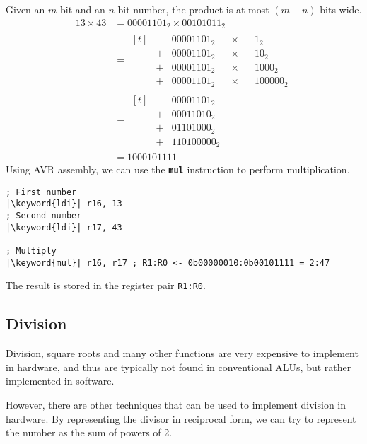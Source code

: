\documentclass{report}
\newcommand{\keyword}[1]{\textcolor[rgb]{0.00,0.50,0.00}{\textbf{#1}}}
\newcommand{\keywordinline}[1]{\textcolor[rgb]{0.00,0.50,0.00}{\textbf{\texttt{#1}}}}
\begin{document}
Given an \(m\)-bit and an \(n\)-bit number, the product is at most
\((m+n)\)-bits wide.
\begin{align*}
    13 \times 43 & = 00001101_2 \times 00101011_2                \\
                 & =
                     \begin{aligned}[t]
                          &   & 00001101_2 &  & \times &  & 1_2      \\
                          & + & 00001101_2 &  & \times &  & 10_2     \\
                          & + & 00001101_2 &  & \times &  & 1000_2   \\
                          & + & 00001101_2 &  & \times &  & 100000_2
                     \end{aligned}
    \\
                 & =
                     \begin{aligned}[t]
                          &   & 00001101_2  \\
                          & + & 00011010_2  \\
                          & + & 01101000_2  \\
                          & + & 110100000_2
                     \end{aligned}
    \\
                 & = 1000101111
\end{align*}
Using AVR assembly, we can use the \keywordinline{mul} instruction to perform multiplication.
\begin{verbatim}
; First number
|\keyword{ldi}| r16, 13
; Second number
|\keyword{ldi}| r17, 43

; Multiply
|\keyword{mul}| r16, r17 ; R1:R0 <- 0b00000010:0b00101111 = 2:47
\end{verbatim}
The result is stored in the register pair \texttt{R1:R0}.
\subsection{Division}
Division, square roots and many other functions are very expensive to
implement in hardware, and thus are typically not found in conventional
ALUs, but rather implemented in software.

However, there are other techniques that can be used to implement
division in hardware. By representing the divisor in reciprocal form,
we can try to represent the number as the sum of powers of 2.
\end{document}

